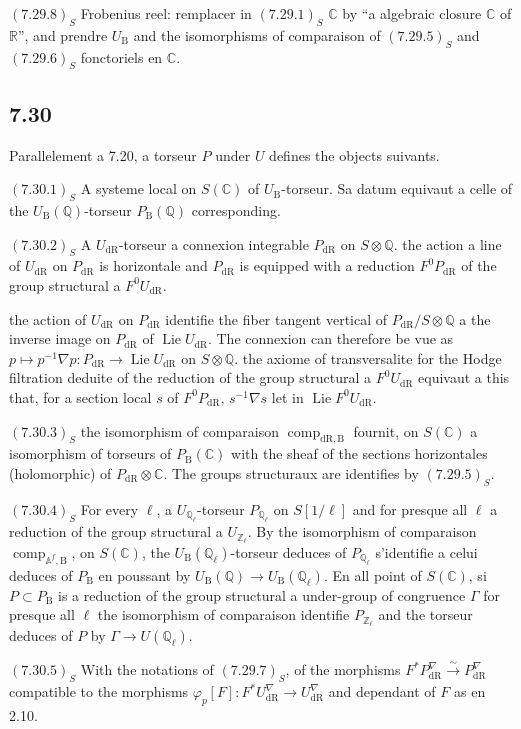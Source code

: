 \documentclass[12pt,a4paper]{article}
\theoremstyle{plain}
\theoremstyle{definition}
\theoremstyle{remark}
\DeclareMathOperator{\Lie}{Lie}
\DeclareMathOperator{\comp}{comp}
\newcommand{\DR}{\mathrm{dR}}
\newcommand{\B}{\mathrm{B}}
\newcommand{\Z}{\mathbb{Z}}
\newcommand{\Q}{\mathbb{Q}}
\newcommand{\C}{\mathbb{C}}
\newcommand{\R}{\mathbb{R}}
\newcommand{\A}{\mathbb{A}}
\begin{document}
$(7.29.8)_S$ Frobenius reel: remplacer in $(7.29.1)_S$ $\C$ by ``a algebraic closure $\C$ of $\R$'', and prendre $U_\B$ and the isomorphisms of comparaison of $(7.29.5)_S$ and $(7.29.6)_S$ fonctoriels en $\C$.

\subsection*{7.30}
Parallelement a 7.20, a torseur $P$ under $U$ defines the objects suivants.

$(7.30.1)_S$ A systeme local on $S(\C)$ of $U_\B$-torseur. Sa datum equivaut a celle of the $U_\B(\Q)$-torseur $P_\B(\Q)$ corresponding.

$(7.30.2)_S$ A $U_\DR$-torseur a connexion integrable $P_\DR$ on $S \otimes \Q$. the action a line of $U_\DR$ on $P_\DR$ is horizontale and $P_\DR$ is equipped with a reduction $F^0P_\DR$ of the group structural a $F^0U_\DR$.

the action of $U_\DR$ on $P_\DR$ identifie the fiber tangent vertical of $P_\DR/S \otimes \Q$ a the inverse image on $P_\DR$ of $\Lie U_\DR$. The connexion can therefore be vue as $p \mapsto p^{-1}\nabla p: P_\DR \to \Lie U_\DR$ on $S \otimes \Q$. the axiome of transversalite for the Hodge filtration deduite of the reduction of the group structural a $F^0U_\DR$ equivaut a this that, for a section local $s$ of $F^0P_\DR$, $s^{-1}\nabla s$ let in $\Lie F^0U_\DR$.

$(7.30.3)_S$ the isomorphism of comparaison $\comp_{\DR,\B}$ fournit, on $S(\C)$ a isomorphism of torseurs of $P_\B(\C)$ with the sheaf of the sections horizontales (holomorphic) of $P_\DR \otimes \C$. The groups structuraux are identifies by $(7.29.5)_S$.

$(7.30.4)_S$ For every $\ell$, a $U_{\Q_\ell}$-torseur $P_{\Q_\ell}$ on $S[1/\ell]$ and for presque all $\ell$ a reduction of the group structural a $U_{\Z_\ell}$. By the isomorphism of comparaison $\comp_{\A^f,\B}$, on $S(\C)$, the $U_\B(\Q_\ell)$-torseur deduces of $P_{\Q_\ell}$ s'identifie a celui deduces of $P_\B$ en poussant by $U_\B(\Q) \to U_\B(\Q_\ell)$. En all point of $S(\C)$, si $P \subset P_\B$ is a reduction of the group structural a under-group of congruence $\Gamma$ for presque all $\ell$ the isomorphism of comparaison identifie $P_{\Z_\ell}$ and the torseur deduces of $P$ by $\Gamma \to U(\Q_\ell)$.

$(7.30.5)_S$ With the notations of $(7.29.7)_S$, of the morphisms $F^*P^{\nabla}_\DR \xrightarrow{\sim} P^{\nabla}_\DR$ compatible to the morphisms $\varphi_p[F]: F^*U^{\nabla}_\DR \to U^{\nabla}_\DR$ and dependant of $F$ as en 2.10.
\end{document}
